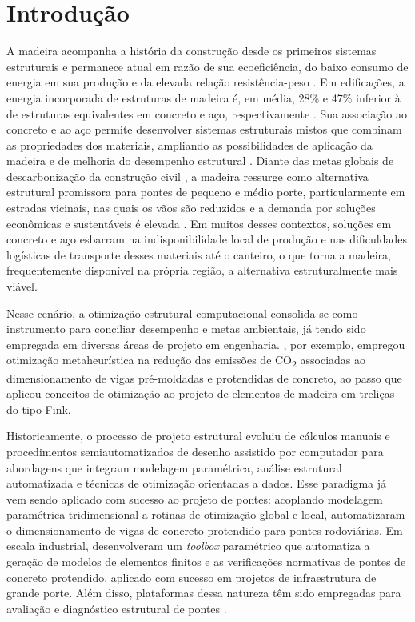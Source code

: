 \section{Introdução}\label{sec:introducao}

A madeira acompanha a história da construção desde os primeiros sistemas estruturais e permanece atual em razão de sua ecoeficiência, do baixo consumo de energia em sua produção e da elevada relação resistência-peso \parencite{FRAGA2025}.
Em edificações, a energia incorporada de estruturas de madeira é, em média, 28\% e 47\% inferior à de estruturas equivalentes em concreto e aço, respectivamente \parencite{Schenk2022}.
Sua associação ao concreto e ao aço permite desenvolver sistemas estruturais mistos que combinam as propriedades dos materiais, ampliando as possibilidades de aplicação da madeira e de melhoria do desempenho estrutural \parencite{PASTORI2022}.
Diante das metas globais de descarbonização da construção civil \parencite{Li2025}, a madeira ressurge como alternativa estrutural promissora para pontes de pequeno e médio porte, particularmente em estradas vicinais, nas quais os vãos são reduzidos e a demanda por soluções econômicas e sustentáveis é elevada \parencite{Milani2020}.
Em muitos desses contextos, soluções em concreto e aço esbarram na indisponibilidade local de produção e nas dificuldades logísticas de transporte desses materiais até o canteiro, o que torna a madeira, frequentemente disponível na própria região, a alternativa estruturalmente mais viável.

Nesse cenário, a otimização estrutural computacional consolida-se como instrumento para conciliar desempenho e metas ambientais, já tendo sido empregada em diversas áreas de projeto em engenharia. \textcite{Moraes2022}, por exemplo, empregou otimização metaheurística na redução das emissões de CO\textsubscript{2} associadas ao dimensionamento de vigas pré-moldadas e protendidas de concreto, ao passo que \textcite{FRAGA2025} aplicou conceitos de otimização ao projeto de elementos de madeira em treliças do tipo Fink.

Historicamente, o processo de projeto estrutural evoluiu de cálculos manuais e procedimentos semiautomatizados de desenho assistido por computador para abordagens que integram modelagem paramétrica, análise estrutural automatizada e técnicas de otimização orientadas a dados.
Esse paradigma já vem sendo aplicado com sucesso ao projeto de pontes: acoplando modelagem paramétrica tridimensional a rotinas de otimização global e local, \textcite{deMoraes2025} automatizaram o dimensionamento de vigas de concreto protendido para pontes rodoviárias.
Em escala industrial, \textcite{Rajic2026} desenvolveram um \textit{toolbox} paramétrico que automatiza a geração de modelos de elementos finitos e as verificações normativas de pontes de concreto protendido, aplicado com sucesso em projetos de infraestrutura de grande porte.
Além disso, plataformas dessa natureza têm sido empregadas para avaliação e diagnóstico estrutural de pontes \parencite{Garbowski2023, Alseid2025, Miluccio2026}.

